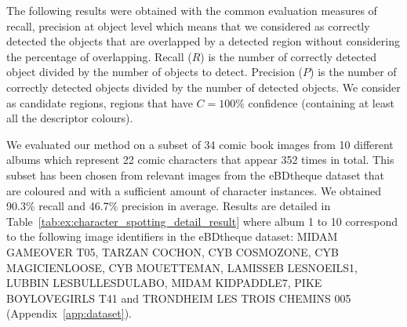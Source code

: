 The following results were obtained with the common evaluation measures of recall, precision at object level which means that we considered as correctly detected the objects that are overlapped by a detected region without considering the percentage of overlapping.
Recall ($R$) is the number of correctly detected object divided by the number of objects to detect.
Precision ($P$) is the number of correctly detected objects divided by the number of detected objects.
We consider as candidate regions, regions that have $C=100\%$ confidence (containing at least all the descriptor colours).%

We evaluated our method on a subset of 34 comic book images from 10 different albums which represent 22 comic characters that appear 352 times in total.
This subset has been chosen from relevant images from the eBDtheque dataset that are coloured and with a sufficient amount of character instances. 
We obtained 90.3\% recall and 46.7\% precision in average.
Results are detailed in Table~\ref{tab:ex:character_spotting_detail_result} where album 1 to 10 correspond to the following image identifiers in the eBDtheque dataset: MIDAM GAMEOVER T05, TARZAN COCHON, CYB COSMOZONE, CYB MAGICIENLOOSE, 
CYB MOUETTEMAN, LAMISSEB LESNOEILS1, LUBBIN LESBULLESDULABO, MIDAM KIDPADDLE7, PIKE BOYLOVEGIRLS T41 and TRONDHEIM LES TROIS CHEMINS 005 (Appendix~\ref{app:dataset}).



